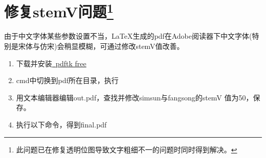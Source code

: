 \documentclass[twoside,longtitle]{LZUthesis}
\begin{document}
\section[修复stemV问题]{修复stemV问题\footnote{此问题已在修复透明位图导致文字粗细不一的问题时同时得到解决。}}

由于中文字体某些参数设置不当，\LaTeX{}生成的pdf在Adobe阅读器下中文字体(特别是宋体与仿宋)会稍显模糊，可通过修改stemV值改善。
\begin{enumerate}
\item 下载并安装\href{https://www.pdflabs.com/tools/pdftk-the-pdf-toolkit/}
{~pdftk free}
\item cmd中切换到pdf所在目录，执行



\item 用文本编辑器编辑out.pdf，查找并修改simsun与fangsong的stemV 值为50，保存。
\item 执行以下命令，得到final.pdf



\end{enumerate}
\end{document}
